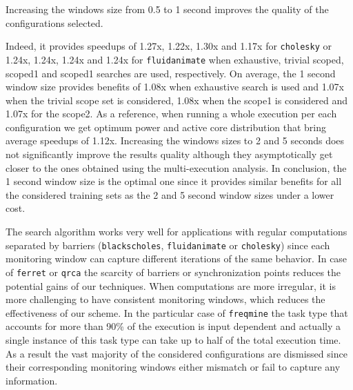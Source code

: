 Increasing the windows size from 0.5 to 1 second improves the quality of the
configurations selected. 

Indeed, it provides speedups of 1.27x, 1.22x, 1.30x and 1.17x for \texttt{cholesky} or
1.24x, 1.24x, 1.24x and 1.24x for \texttt{fluidanimate} when exhaustive, trivial scoped,
scoped1 and scoped1 searches are used, respectively.  On average, the 1 second window size
provides benefits of 1.08x when exhaustive search is used and 1.07x when the trivial scope
set is considered, 1.08x when the scope1 is considered and 1.07x for the scope2.  As a
reference, when running a whole execution per each configuration we get optimum power and
active core distribution that bring average speedups of 1.12x.  Increasing the windows
sizes to 2 and 5 seconds does not significantly improve the results quality although they
asymptotically get closer to the ones obtained using the multi-execution analysis.  In
conclusion, the 1 second window size is the optimal one since it provides similar benefits
for all the considered training sets as the 2 and 5 second window sizes under a lower
cost.

The search algorithm works very well for applications with regular computations separated
by barriers (\texttt{blackscholes}, \texttt{fluidanimate} or \texttt{cholesky}) since each
monitoring window can capture different iterations of the same behavior.  In case of
\texttt{ferret} or \texttt{qrca} the scarcity of barriers or synchronization points
reduces the potential gains of our techniques.  When computations are more irregular, it
is more challenging to have consistent monitoring windows, which reduces the effectiveness
of our scheme.  In the particular case of \texttt{freqmine} the task type that accounts
for more than 90\% of the execution is input dependent and actually a single instance of
this task type can take up to half of the total execution time.  As a result the vast
majority of the considered configurations are dismissed since their corresponding
monitoring windows either mismatch or fail to capture any information.

